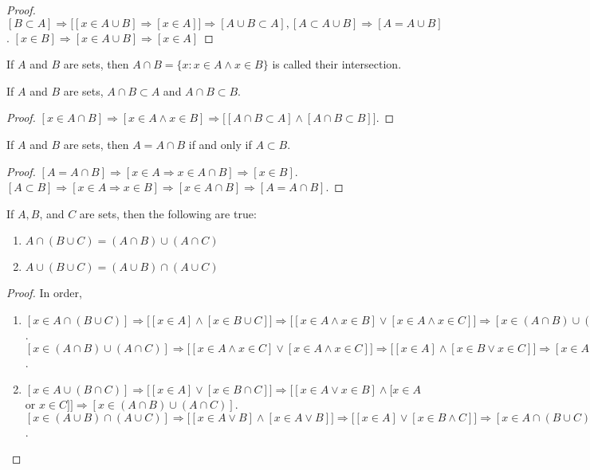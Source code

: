 \documentclass[crop=false,class=article,oneside]{standalone}
\begin{document}
        \begin{proof}
        $[B\subset A]\Rightarrow \big[[x\in A\cup B] \Rightarrow [x\in A]\big]\Rightarrow[A\cup B \subset A], [A\subset A\cup B]\Rightarrow[A=A\cup B]$. $[x\in B] \Rightarrow [x\in A\cup B]\Rightarrow [x\in A]$
        \end{proof}
        \begin{definition}
        If $A$ and $B$ are sets, then $A\cap B = \{x:x\in A \land x\in B\}$ is called their intersection.
        \end{definition}
        \begin{corollary}
        If $A$ and $B$ are sets, $A\cap B \subset A$ and $A\cap B \subset B$.
        \end{corollary}
        \begin{proof}
        $[x\in A\cap B]\Rightarrow [x\in A\land x\in B]\Rightarrow \big[[A\cap B \subset A]\land [A\cap B \subset B]\big]$.
        \end{proof}
        \begin{theorem}
        If $A$ and $B$ are sets, then $A=A\cap B$ if and only if $A\subset B$.
        \end{theorem}
        \begin{proof}
        $[A=A\cap B]\Rightarrow [x\in A\Rightarrow x\in A \cap B]\Rightarrow [x\in B]$. $[A\subset B]\Rightarrow [x\in A\Rightarrow x\in B]\Rightarrow [x\in A\cap B]\Rightarrow [A=A\cap B]$.
        \end{proof}
        \begin{theorem}
        If $A,B$, and $C$ are sets, then the following are true:
        \begin{enumerate}
        \item $A\cap (B\cup C) = (A\cap B)\cup (A\cap C)$
        \item $A\cup (B\cup C) = (A\cup B)\cap (A\cup C)$
        \end{enumerate}
        \end{theorem}
        \begin{proof}
        In order,
        \begin{enumerate}
        \item $[x\in A\cap (B\cup C)]\Rightarrow \big[[x\in A] \land [x\in B\cup C]\big]\Rightarrow \big[[x\in A\land x\in B]\lor [x\in A\land x\in C]\big]\Rightarrow [x\in (A\cap B)\cup (A\cap C)]$. $[x\in (A\cap B)\cup(A\cap C)]\Rightarrow \big[[x\in A\land x\in C]\lor [x\in A \land x\in C]\big]\Rightarrow \big[[x\in A]\land [x\in B\lor x\in C]\big]\Rightarrow [x\in A\cap(B\cup C)]$.
        \item $[x\in A\cup (B\cap C)]\Rightarrow \big[[x\in A]\lor [x\in B\cap C]\big] \Rightarrow \big[[x\in A \lor x\in B]\land [x\in A$ or $x\in C]\big]\Rightarrow [x\in (A\cap B)\cup (A\cap C)]$. $[x\in (A\cup B)\cap (A\cup C)]\Rightarrow \big[[x\in A\lor B]\land [x\in A\lor B]\big]\Rightarrow \big[[x\in A]\lor[x\in B\land C]\big]\Rightarrow [x\in A\cap(B\cup C)]$.
        \end{enumerate}
        \end{proof}
\end{document}
